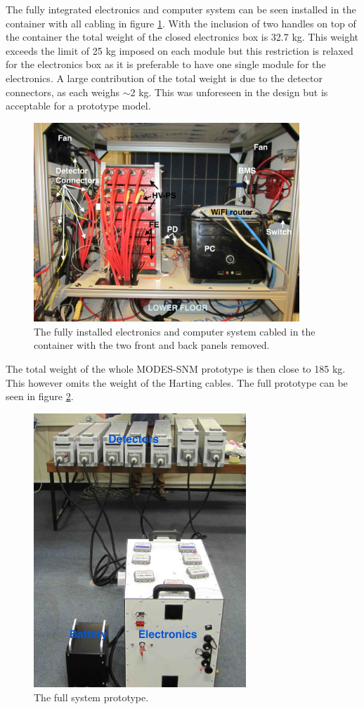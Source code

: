 The fully integrated electronics and computer system can be seen installed in the container with all cabling in figure \ref{fig:electronicsBoxInstalledOpen}. With the inclusion of two handles on top of the container the total weight of the closed electronics box is 32.7 kg. This weight exceeds the limit of 25 kg imposed on each module but this restriction is relaxed for the electronics box as it is preferable to have one single module for the electronics. A large contribution of the total weight is due to the detector connectors, as each weighs $\sim$2 kg. This was unforeseen in the design but is acceptable for a prototype model.

\begin{figure}[htbp]
\begin{center}
\includegraphics[width=100mm]{Chapter6/figures/electronicsBoxInstalledOpenAnnotated.jpg}
\caption{The fully installed electronics and computer system cabled in the container with the two front and back panels removed.}
\label{fig:electronicsBoxInstalledOpen}
\end{center}
\end{figure}

The total weight of the whole MODES-SNM prototype is then close to 185 kg. This however omits the weight of the Harting cables. The full prototype can be seen in figure \ref{fig:fullSystem}.

\begin{figure}[htbp]
\begin{center}
\includegraphics[width=80mm]{Chapter6/figures/fullSystem2.jpg}
\caption{The full system prototype.}
\label{fig:fullSystem}
\end{center}
\end{figure}

